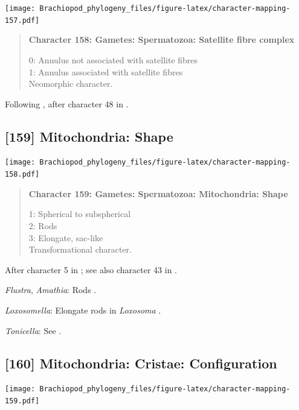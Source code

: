 \documentclass[openany]{book}
\begin{document}
\texttt{[image: Brachiopod\_phylogeny\_files/figure-latex/character-mapping-157.pdf]}

\begin{quote}
\textbf{Character 158: Gametes: Spermatozoa: Satellite fibre complex}

0: Annulus not associated with satellite fibres\\
1: Annulus associated with satellite fibres\\
Neomorphic character.
\end{quote}

Following \citet{Smith2012}, after character 48 in \citet{Ponder1997}.

\subsection*{{[}159{]} Mitochondria: Shape}\label{mitochondria-shape}

\texttt{[image: Brachiopod\_phylogeny\_files/figure-latex/character-mapping-158.pdf]}

\begin{quote}
\textbf{Character 159: Gametes: Spermatozoa: Mitochondria: Shape}

1: Spherical to subspherical\\
2: Rods\\
3: Elongate, sac-like\\
Transformational character.
\end{quote}

After character 5 in \citet{BucklandNicks2008}; see also character 43 in
\citet{Ponder1997}.

\hypertarget{Amathia-coding-159}{}
\emph{Flustra}, \emph{Amathia}: Rods \citep{Franzen1981}.

\hypertarget{Loxosomella-coding-159}{}
\emph{Loxosomella}: Elongate rods in \emph{Loxosoma}
\citep{Franzen2000}.

\hypertarget{Tonicella-coding-159}{}
\emph{Tonicella}: See \citet{BucklandNicks1988}.

\subsection*{{[}160{]} Mitochondria: Cristae:
Configuration}\label{mitochondria-cristae-configuration}

\texttt{[image: Brachiopod\_phylogeny\_files/figure-latex/character-mapping-159.pdf]}
\end{document}

